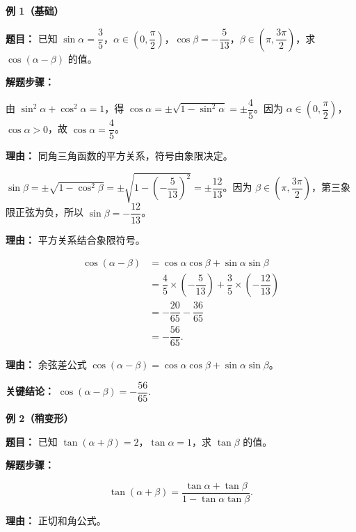 \begin{examplebox}
	\textbf{\textcolor{CExample}{例 1（基础）}}

	\textbf{\textcolor{CExample}{题目：}}
	已知 $\sin\alpha=\dfrac{3}{5}$，$\alpha\in\left(0,\dfrac{\pi}{2}\right)$，$\cos\beta=-\dfrac{5}{13}$，$\beta\in\left(\pi,\dfrac{3\pi}{2}\right)$，求 $\cos(\alpha-\beta)$ 的值。

	\textbf{\textcolor{CExample}{解题步骤：}}
	\begin{description}[style=nextline, leftmargin=2.8em, labelsep=0.5em, itemsep=0.45em]
		\item[\textbf{第一步（求 $\cos\alpha$）：}] 由 $\sin^2\alpha+\cos^2\alpha=1$，得 $\cos\alpha=\pm\sqrt{1-\sin^2\alpha}=\pm\dfrac{4}{5}$。因为 $\alpha\in\left(0,\dfrac{\pi}{2}\right)$，$\cos\alpha>0$，故 $\cos\alpha=\dfrac{4}{5}$。
			\par\textbf{理由：} 同角三角函数的平方关系，符号由象限决定。

		\item[\textbf{第二步（求 $\sin\beta$）：}] $\sin\beta=\pm\sqrt{1-\cos^2\beta}=\pm\sqrt{1-\left(-\dfrac{5}{13}\right)^2}=\pm\dfrac{12}{13}$。因为 $\beta\in\left(\pi,\dfrac{3\pi}{2}\right)$，第三象限正弦为负，所以 $\sin\beta=-\dfrac{12}{13}$。
			\par\textbf{理由：} 平方关系结合象限符号。

		\item[\textbf{第三步（代入余弦差公式）：}]
			\[
				\begin{aligned}
					\cos(\alpha-\beta) &= \cos\alpha\cos\beta+\sin\alpha\sin\beta \\
					&= \dfrac{4}{5}\times\left(-\dfrac{5}{13}\right)+\dfrac{3}{5}\times\left(-\dfrac{12}{13}\right) \\
					&= -\dfrac{20}{65}-\dfrac{36}{65} \\
					&= -\dfrac{56}{65}.
			\end{aligned}
			\]
			\par\textbf{理由：} 余弦差公式 $\cos(\alpha-\beta)=\cos\alpha\cos\beta+\sin\alpha\sin\beta$。
	\end{description}

	\textbf{\textcolor{CExample}{关键结论：}}
	\textbf{$\cos(\alpha-\beta)=-\dfrac{56}{65}$}.

	\medskip
	\textbf{\textcolor{CExample}{例 2（稍变形）}}

	\textbf{\textcolor{CExample}{题目：}}
	已知 $\tan(\alpha+\beta)=2$，$\tan\alpha=1$，求 $\tan\beta$ 的值。

	\textbf{\textcolor{CExample}{解题步骤：}}
	\begin{description}[style=nextline, leftmargin=2.8em, labelsep=0.5em, itemsep=0.45em]
		\item[\textbf{第一步（展开正切和公式）：}]
			\[
				\tan(\alpha+\beta)=\frac{\tan\alpha+\tan\beta}{1-\tan\alpha\tan\beta}.
			\]
			\par\textbf{理由：} 正切和角公式。


\end{description}
\end{examplebox}
